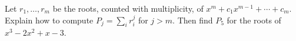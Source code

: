 Let $r_1,\ldots,r_m$ be the roots, counted with multiplicity, of $x^m+c_1x^{m-1}+\cdots+c_m$. Explain how to compute $P_j=\sum_i r_i^j$ for $j>m$. Then find $P_5$ for the roots of $x^3-2x^2+x-3$.
